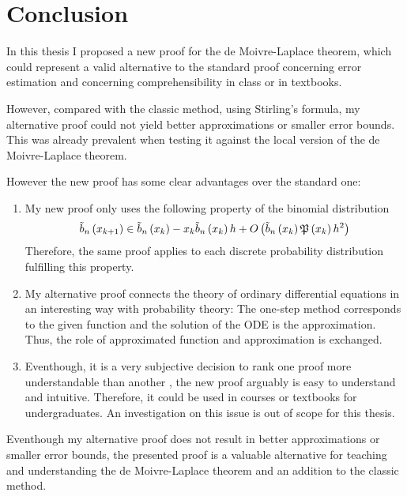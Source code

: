 \chapter{Conclusion}

In this thesis I proposed a new proof for the de Moivre-Laplace theorem, which could represent a valid alternative to the standard proof concerning error estimation and concerning comprehensibility in class or in textbooks. 

However, compared with the classic method, using Stirling’s formula, my alternative proof could not yield better approximations or smaller error bounds. This was already prevalent when testing it against the local version of the de Moivre-Laplace theorem.

However the new proof has some clear advantages over the standard one:

\begin{enumerate}
  \item My new proof only uses the following property of the binomial distribution
    \begin{align}
      \bb{\x[k+1]} \in \bb{\x[k]} - \x[k]\bb{\x[k]} h + \bigo{\bb{\x[k]} \pol{\x[k]} h^2}
    \end{align}
    Therefore, the same proof applies to each discrete probability distribution fulfilling this property.

  \item My alternative proof connects the theory of ordinary differential equations in an interesting way with probability theory: The one-step method corresponds to the given function and the solution of the ODE is the approximation. Thus, the role of approximated function and approximation is exchanged.

  \item Eventhough, it is a very subjective decision to rank one proof more understandable than another \cite{tampis:understandability}, the new proof arguably is easy to understand and intuitive. Therefore, it could be used in courses or textbooks for undergraduates. An investigation on this issue is out of scope for this thesis.
\end{enumerate}

Eventhough my alternative proof does not result in better approximations or smaller error bounds, the presented proof is a valuable alternative for teaching and understanding the de Moivre-Laplace theorem and an addition to the classic method. 
